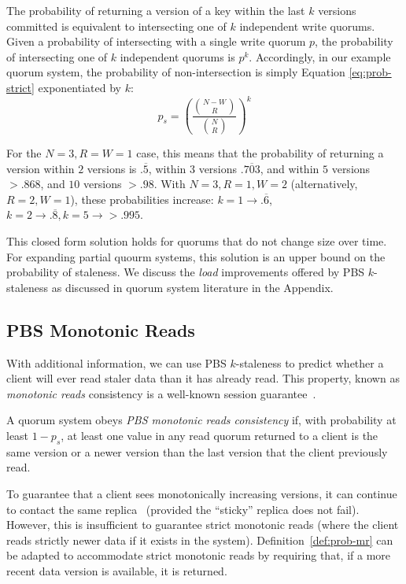 \documentclass{vldb}
\newcommand{\subsectionskip}{-0em}
\begin{document}
The probability of returning a version of a key within the last $k$
versions committed is equivalent to intersecting one of $k$
independent write quorums.  Given a probability of intersecting with a
single write quorum $p$, the probability of intersecting one of $k$
independent quorums is $p^k$.  Accordingly, in our example quorum
system, the probability of non-intersection is simply Equation
\ref{eq:prob-strict} exponentiated by $k$:
\begin{equation}
\label{eq:k-consistency}
p_{s} = \left(\frac{{N-W \choose R}}{{N \choose R}}\right)^k
\end{equation}

For the $N=3, R=W=1$ case, this means that the probability of
returning a version within $2$ versions is $.\overline{5}$, within $3$
versions $.\overline{703}$, and within $5$ versions $> .868$, and $10$
versions $>.98$.  With $N=3, R=1, W=2$ (alternatively, $R=2, W=1$),
these probabilities increase: $k=1 \rightarrow
.\overline{6}$, $k=2 \rightarrow .\overline{8}, k=5 \rightarrow >
.995$.

This closed form solution holds for quorums that do not change size
over time.  For expanding partial quourm systems, this solution is an
upper bound on the probability of staleness.  We discuss the
\textit{load} improvements offered by PBS $k$-staleness as discussed
in quorum system literature in the Appendix.

\vspace{\subsectionskip}\subsection{PBS Monotonic Reads}

With additional information, we can use PBS $k$-staleness to predict
whether a client will ever read staler data than it has already read.
This property, known as \textit{monotonic reads} consistency is a
well-known session guarantee~\cite{sessionguarantees}.

\begin{definition}
\label{def:prob-mr}
A quorum system obeys \textit{PBS monotonic reads consistency} if,
with probability at least $1-p_{s}$, at least one value in any
read quorum returned to a client is the same version or a newer
version than the last version that the client previously read.
\end{definition}

To guarantee that a client sees monotonically increasing versions, it
can continue to contact the same replica~\cite{vogels-defs} (provided
the ``sticky'' replica does not fail).  However, this is insufficient to
guarantee strict monotonic reads (where the client reads strictly
newer data if it exists in the system).  Definition~\ref{def:prob-mr}
can be adapted to accommodate strict monotonic reads by requiring
that, if a more recent data version is available, it is returned.
\end{document}

